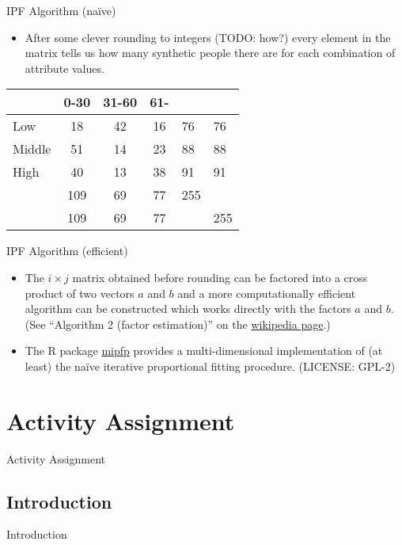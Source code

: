 \documentclass{beamer}
\begin{document}
\begin{frame}{IPF Algorithm (naïve)}
\begin{itemize}
\item After some clever rounding to integers (TODO: how?) every
  element in the matrix tells us how many synthetic people there are
  for each combination of attribute values.
\end{itemize}

\begin{table}
\centering
\begin{tabular}{l||c c c||l|l}
         &  0-30 & 31-60 & 61-   & \sumact{} & \sumreq{}\\
\hline \hline
Low      &  18   &  42   &  16   & 76 & 76 \\
Middle   &  51   &  14   &  23   & 88 & 88 \\
High     &  40   &  13   &  38   & 91 & 91 \\
\hline \hline
\sumact{}& 109   &  69   &  77   & 255 & \\
\hline
\sumreq{}& 109   &  69   &  77   & & 255 \\
\end{tabular}
\end{table}
\end{frame}
\begin{frame}{IPF Algorithm (efficient)}

\begin{itemize}
\item The \(i \times j\)
  matrix obtained before rounding can be factored into a cross product
  of two vectors \(a\)
  and \(b\)
  and a more computationally efficient algorithm can be constructed
  which works directly with the factors \(a\)
  and \(b\).
  (See ``Algorithm 2 (factor estimation)'' on the
  \href{https://en.wikipedia.org/wiki/Iterative_proportional_fitting}{wikipedia
    page}.)
\item The R package
  \href{https://cran.r-project.org/web/packages/mipfp/}{mipfp}
  provides a multi-dimensional implementation of (at least) the naïve
  iterative proportional fitting procedure. (LICENSE: GPL-2)
\end{itemize}

\end{frame}


\section{Activity Assignment}
\begin{frame}
  \centering
  \LARGE
  Activity Assignment
\end{frame}


\subsection{Introduction}
\begin{frame}{Introduction}
\end{frame}
\end{document}
